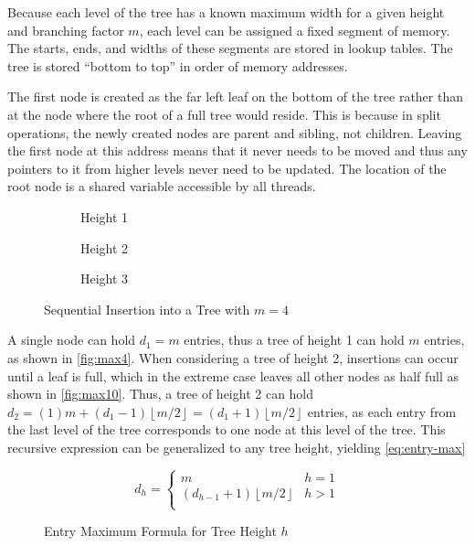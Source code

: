 Because each level of the tree has a known maximum width for a given height and
branching factor $m$, each level can be assigned a fixed segment of memory. The
starts, ends, and widths of these segments are stored in lookup tables. The tree
is stored ``bottom to top'' in order of memory addresses.

The first node is created as the far left leaf on the bottom of the tree rather
than at the node where the root of a full tree would reside. This is because in
split operations, the newly created nodes are parent and sibling, not children.
Leaving the first node at this address means that it never needs to be moved and
thus any pointers to it from higher levels never need to be updated. The
location of the root node is a shared variable accessible by all threads.

\begin{figure}[h]
	\centering
	\begin{subfigure}{6em}
		\centering
		
		\caption{Height 1}
		\label{fig:max4}
	\end{subfigure}
	\begin{subfigure}{15em}
		\centering
		
		\caption{Height 2}
		\label{fig:max10}
	\end{subfigure}
	\begin{subfigure}{\textwidth}
		\centering
		
		\caption{Height 3}
		\label{fig:max22}
	\end{subfigure}
	\caption{Sequential Insertion into a Tree with $m=4$}
	\label{fig:memory-hierarchy}
\end{figure}

A single node can hold $d_1=m$ entries, thus a tree of height 1 can hold $m$
entries, as shown in \autoref{fig:max4}. When considering a tree of height 2,
insertions can occur until a leaf is full, which in the extreme case leaves all
other nodes as half full as shown in \autoref{fig:max10}. Thus, a tree of height
2 can hold $d_2 = (1)m + (d_1-1)\left\lfloor{m/2}\right\rfloor =
(d_1+1)\left\lfloor{m/2}\right\rfloor$ entries, as each entry from the last
level of the tree corresponds to one node at this level of the tree.
%
This recursive expression can be generalized to any tree height, yielding
\autoref{eq:entry-max}

\begin{figure}[h]
	\centering
	\ssp
	\begin{equation}
		d_h = \begin{cases}
			m & h = 1 \\
			(d_{h-1}+1)\left\lfloor{m/2}\right\rfloor & h > 1 \\
		\end{cases}
		\label{eq:entry-max}
	\end{equation}
	\caption*{Entry Maximum Formula for Tree Height $h$}
\end{figure}

